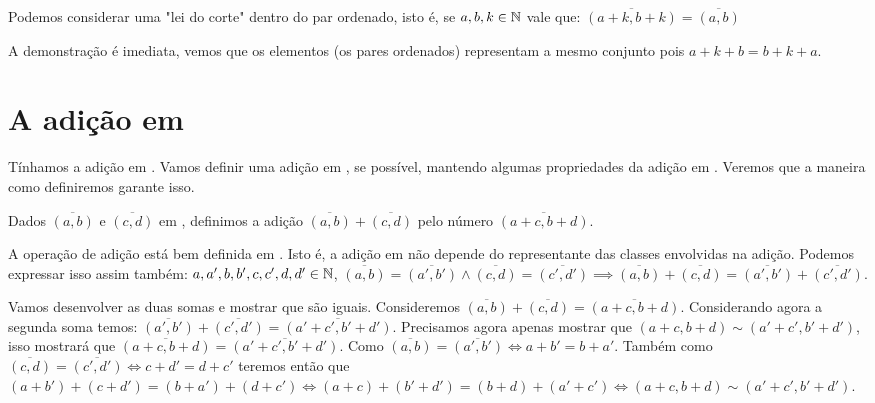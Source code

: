\documentclass[../main.tex]{subfiles}
\begin{document}
\begin{prop}
    Podemos considerar uma "lei do corte" dentro do par ordenado, isto é, se $a,b,k \in \mathbb{N}$ vale que: $\overline{(a+k,b+k)} = \overline{(a,b)}$
\end{prop}
\begin{dem}
    A demonstração é imediata, vemos que os elementos (os pares ordenados) representam a mesmo conjunto pois $a+k+b = b+k+a$.
\end{dem}

\section{A adição em \Z}
Tínhamos a adição em \N. Vamos definir uma adição em \Z, se possível, mantendo algumas propriedades da adição em \N. Veremos que a maneira como definiremos garante isso.
\begin{defi}
    Dados $\overline{(a,b)}$ e $\overline{(c,d)}$ em \Z, definimos a adição $\overline{(a,b)} + \overline{(c,d)}$ pelo número $\overline{(a+c, b+d)}$.
\end{defi}
\begin{prop}
    A operação de adição está bem definida em \Z. Isto é, a adição em \Z não depende do representante das classes envolvidas na adição. Podemos expressar isso assim também: $a,a',b,b',c,c',d,d' \in \mathbb{N}$, $\overline{(a,b)} = \overline{(a',b')} \land \overline{(c,d)} = \overline{(c',d')}
    \implies \overline{(a,b)} + \overline{(c,d)} = \overline{(a',b')} + \overline{(c',d')} $.
\end{prop}
\begin{dem}
    Vamos desenvolver as duas somas e mostrar que são iguais. Consideremos 
    $\overline{(a,b)} + \overline{(c,d)} = \overline{(a+c,b+d)}$.
    Considerando agora a segunda soma temos: 
    $\overline{(a',b')} + \overline{(c',d')} = \overline{(a'+c',b'+d')}$.
    Precisamos agora apenas mostrar que $(a+c,b+d) \sim (a'+c',b'+d')$, isso mostrará que 
    $\overline{(a+c,b+d)} = \overline{(a'+c',b'+d')}$. 
    Como $\overline{(a,b)} = \overline{(a',b')} \iff a+b' = b+a'$.
    Também como $\overline{(c,d)} = \overline{(c',d')} \iff c+d' = d+c'$ teremos então que $(a+b')+(c+d') = (b+a')+(d+c') \iff (a+c) + (b'+d') = (b+d) + (a'+c') \iff (a+c,b+d) \sim (a'+c',b'+d')$.
\end{dem}
\end{document}
